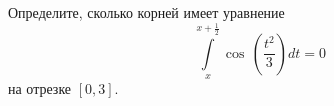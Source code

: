 \documentclass{article}
\begin{document}
Определите, сколько корней имеет уравнение
$$\int\limits_x^{x+\frac{1}{2}} \cos\, \left( \frac{t^2}{3} \right) dt = 0$$
на отрезке $[0,3]$.
\end{document}
